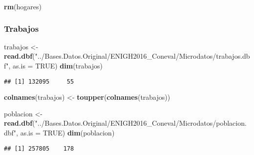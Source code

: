 \documentclass[11pt,]{article}
\newenvironment{Shaded}{\begin{snugshade}}{\end{snugshade}}
\newcommand{\KeywordTok}[1]{\textcolor[rgb]{0.13,0.29,0.53}{\textbf{#1}}}
\newcommand{\DataTypeTok}[1]{\textcolor[rgb]{0.13,0.29,0.53}{#1}}
\newcommand{\StringTok}[1]{\textcolor[rgb]{0.31,0.60,0.02}{#1}}
\newcommand{\OtherTok}[1]{\textcolor[rgb]{0.56,0.35,0.01}{#1}}
\newcommand{\NormalTok}[1]{#1}
\begin{document}
\begin{Shaded}
\begin{Highlighting}[]
\KeywordTok{rm}\NormalTok{(hogares)}
\end{Highlighting}
\end{Shaded}

\subsubsection{Trabajos}\label{trabajos}

\begin{Shaded}
\begin{Highlighting}[]
\NormalTok{trabajos <-}\StringTok{ }\KeywordTok{read.dbf}\NormalTok{(}\StringTok{"../Bases.Datos.Original/ENIGH2016_Coneval/Microdatos/trabajos.dbf"}\NormalTok{, }
                       \DataTypeTok{as.is =} \OtherTok{TRUE}\NormalTok{)}
\KeywordTok{dim}\NormalTok{(trabajos)}
\end{Highlighting}
\end{Shaded}

\begin{verbatim}
## [1] 132095     55
\end{verbatim}

\begin{Shaded}
\begin{Highlighting}[]
\KeywordTok{colnames}\NormalTok{(trabajos) <-}\StringTok{ }\KeywordTok{toupper}\NormalTok{(}\KeywordTok{colnames}\NormalTok{(trabajos))}

\NormalTok{poblacion <-}\StringTok{ }\KeywordTok{read.dbf}\NormalTok{(}\StringTok{"../Bases.Datos.Original/ENIGH2016_Coneval/Microdatos/poblacion.dbf"}\NormalTok{, }
                       \DataTypeTok{as.is =} \OtherTok{TRUE}\NormalTok{)}
\KeywordTok{dim}\NormalTok{(poblacion)}
\end{Highlighting}
\end{Shaded}

\begin{verbatim}
## [1] 257805    178
\end{verbatim}
\end{document}
